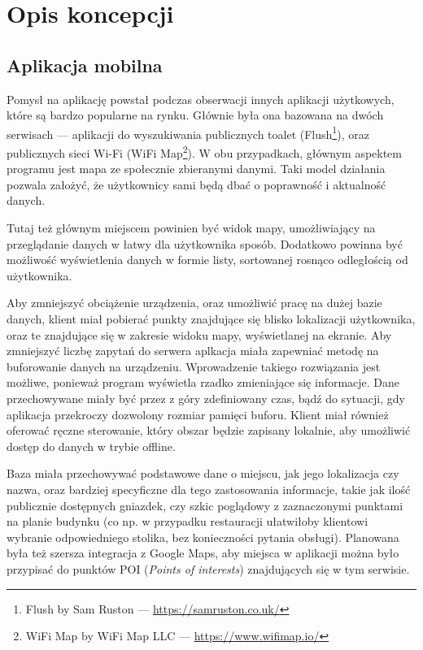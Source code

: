 \documentclass[polish,polish,a4paper,12pt]{article}
\let\sectioncmd\section
\renewcommand{\section}{\clearpage\sectioncmd}
\begin{document}
\section{Opis koncepcji}\label{concept}
	\subsection{Aplikacja mobilna}

	Pomysł na aplikację powstał podczas obserwacji innych aplikacji użytkowych, które są bardzo popularne na rynku. Głównie była ona bazowana na dwóch serwisach — aplikacji do wyszukiwania publicznych toalet (Flush\footnote{Flush by Sam Ruston — \url{https://samruston.co.uk/}}), oraz publicznych sieci Wi-Fi (WiFi Map\footnote{WiFi Map by WiFi Map LLC — \url{https://www.wifimap.io/}}). W obu przypadkach, głównym aspektem programu jest mapa ze społecznie zbieranymi danymi. Taki model działania pozwala założyć, że użytkownicy sami będą dbać o poprawność i aktualność danych.

	Tutaj też głównym miejscem powinien być widok mapy, umożliwiający na przeglądanie danych w łatwy dla użytkownika sposób. Dodatkowo powinna być możliwość wyświetlenia danych w formie listy, sortowanej rosnąco odległością od użytkownika.

	Aby zmniejszyć obciążenie urządzenia, oraz umożliwić pracę na dużej bazie danych, klient miał pobierać punkty znajdujące się blisko lokalizacji użytkownika, oraz te znajdujące się w zakresie widoku mapy, wyświetlanej na ekranie. Aby zmniejszyć liczbę zapytań do serwera aplkacja miała zapewniać metodę na buforowanie danych na urządzeniu. Wprowadzenie takiego rozwiązania jest możliwe, ponieważ program wyświetla rzadko zmieniające się informacje. Dane przechowywane miały być przez z góry zdefiniowany czas, bądź do sytuacji, gdy aplikacja przekroczy dozwolony rozmiar pamięci buforu. Klient miał również oferować ręczne sterowanie, który obszar będzie zapisany lokalnie, aby umożliwić dostęp do danych w trybie offline.

	Baza miała przechowywać podstawowe dane o miejscu, jak jego lokalizacja czy nazwa, oraz bardziej specyficzne dla tego zastosowania informacje, takie jak ilość publicznie dostępnych gniazdek, czy szkic poglądowy z zaznaczonymi punktami na planie budynku (co np. w przypadku restauracji ułatwiłoby klientowi wybranie odpowiedniego stolika, bez konieczności pytania obsługi). Planowana była też szersza integracja z Google Maps, aby miejsca w aplikacji można było przypisać do punktów POI (\textit{Points of interests}) znajdujących się w tym serwisie.
\end{document}
